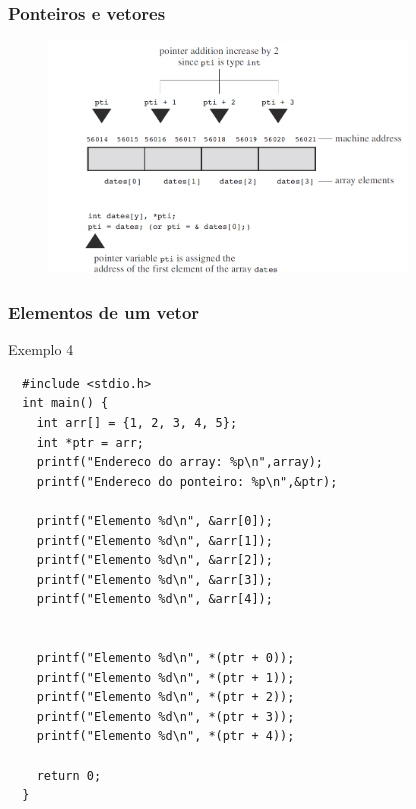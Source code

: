 \begin{frame}
\frametitle{Ponteiros e vetores}

	\begin{figure}[h]
		\centering
		\includegraphics[width=0.85\textwidth]{Imagens/Imag02.png}
	\end{figure}


\end{frame}



\begin{frame}[fragile]
  \frametitle{Elementos de um vetor}
  \begin{block}{Exemplo 4}
  \begin{lstlisting}
  #include <stdio.h>
  int main() {
    int arr[] = {1, 2, 3, 4, 5};
    int *ptr = arr;
    printf("Endereco do array: %p\n",array);
    printf("Endereco do ponteiro: %p\n",&ptr);
    
    printf("Elemento %d\n", &arr[0]);
    printf("Elemento %d\n", &arr[1]);
    printf("Elemento %d\n", &arr[2]);
    printf("Elemento %d\n", &arr[3]);
    printf("Elemento %d\n", &arr[4]);
    
    
    printf("Elemento %d\n", *(ptr + 0));
    printf("Elemento %d\n", *(ptr + 1));
    printf("Elemento %d\n", *(ptr + 2));
    printf("Elemento %d\n", *(ptr + 3));
    printf("Elemento %d\n", *(ptr + 4));
        
    return 0;
  }
  \end{lstlisting}
  \end{block}
\end{frame}



